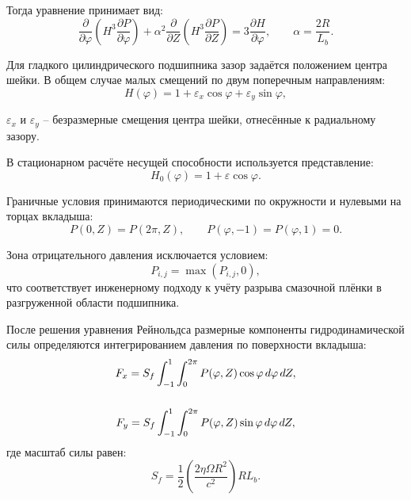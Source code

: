 Тогда уравнение принимает вид:
\begin{equation}
    \frac{\partial}{\partial \varphi}\left(H^3\frac{\partial P}{\partial \varphi}\right)+
    \alpha^2\frac{\partial}{\partial Z}\left(H^3\frac{\partial P}{\partial Z}\right)=
    3\frac{\partial H}{\partial \varphi},
    \qquad \alpha=\frac{2R}{L_b}.
    \label{eq:reynolds_dimensionless}
\end{equation}

Для гладкого цилиндрического подшипника зазор задаётся положением центра шейки. В общем случае малых смещений по двум поперечным направлениям:
\begin{equation}
    H(\varphi)=1+\varepsilon_x\cos\varphi+\varepsilon_y\sin\varphi,
    \label{eq:clearance_general}
\end{equation}
\begin{conditions}
$\varepsilon_x$ и $\varepsilon_y$ -- безразмерные смещения центра шейки, отнесённые к радиальному зазору.
\end{conditions}

В стационарном расчёте несущей способности используется представление:
\begin{equation}
    H_0(\varphi)=1+\varepsilon\cos\varphi.
    \label{eq:clearance_static}
\end{equation}

Граничные условия принимаются периодическими по окружности и нулевыми на торцах вкладыша:
\begin{equation}
    P(0,Z)=P(2\pi,Z),\qquad P(\varphi,-1)=P(\varphi,1)=0.
    \label{eq:boundary_conditions}
\end{equation}

Зона отрицательного давления исключается условием:
\begin{equation}
    P_{i,j}=\max(P_{i,j},0),
    \label{eq:cavitation_simple}
\end{equation}
что соответствует инженерному подходу к учёту разрыва смазочной плёнки в разгруженной области подшипника.

После решения уравнения Рейнольдса размерные компоненты гидродинамической силы определяются интегрированием давления по поверхности вкладыша:
\begin{gather}
F_x=S_f\int_{-1}^{1}\int_{0}^{2\pi}P(\varphi,Z)\cos\varphi\,d\varphi\,dZ,\\[\baselineskip]
F_y=S_f\int_{-1}^{1}\int_{0}^{2\pi}P(\varphi,Z)\sin\varphi\,d\varphi\,dZ,
\end{gather}
где масштаб силы равен:
\begin{equation}
    S_f=\frac{1}{2}\left(\frac{2\eta\Omega R^2}{c^2}\right)RL_b.
\end{equation}

